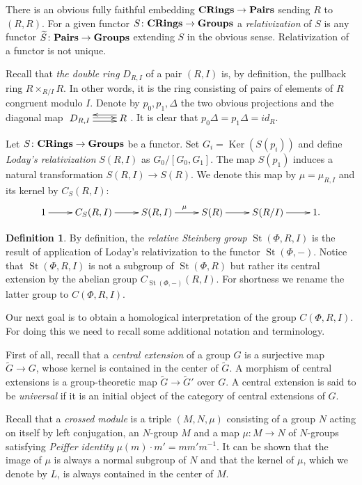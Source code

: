 \documentclass[oneside, 8pt]{amsart}
\theoremstyle{remark}
\theoremstyle{definition}
\numberwithin{lemma}{section}
\numberwithin{prop}{section}
\numberwithin{corollary}{section}
\numberwithin{externaltheorem}{section}
\newtheorem{df}[lemma]{Definition} \Crefname{df}{Definition}{Definitions}
\DeclareMathOperator{\Ker}{Ker}
\DeclareMathOperator{\St}{St}
\newcommand{\catname}[1]{{\normalfont\textbf{#1}}} %
\numberwithin{equation}{section}
\begin{document}
There is an obvious fully faithful embedding $\catname{CRings} \to \catname{Pairs}$ sending $R$ to $(R, R)$. For a given functor $S \colon \catname{CRings} \to \catname{Groups}$ a {\it relativization} of $S$ is any functor $\widetilde{S} \colon \catname{Pairs} \to \catname{Groups}$ extending $S$ in the obvious sense. Relativization of a functor is not unique.

Recall that {\it the double ring} $D_{R, I}$ of a pair $(R, I)$ is, by definition, the pullback ring $R \times_{R/I} R$. In other words, it is the ring consisting of pairs of elements of $R$ congruent modulo $I$. Denote by $p_0, p_1, \Delta$ the two obvious projections and the diagonal map $\xymatrix{D_{R,I} \ar@<1pt>[r] \ar@<-2.5pt>[r] & \ar@<-4pt>[l] R}$. It is clear that $p_0 \Delta = p_1 \Delta = id_{R}$.

Let $S \colon \catname{CRings} \to \catname{Groups}$ be a functor. Set $G_i = \Ker(S(p_i))$ and define {\it Loday's relativization} $S(R, I)$ as $ G_0 / [G_0, G_1]$. The map $S(p_1)$ induces a natural transformation $S(R, I) \to S(R)$. We denote this map by $\mu = \mu_{R,I}$ and its kernel by $C_S(R, I)$: \begin{equation} \label{LodayRelativization} \xymatrix{ 1 \ar[r] & C_S(R, I) \ar[r] & S(R, I) \ar^{\mu}[r] & S(R) \ar[r] & S(R/I) \ar[r] & 1.} \end{equation}

\begin{df} By definition, the {\it relative Steinberg group} $\St(\Phi, R, I)$ is the result of application of Loday's relativization to the functor $\St(\Phi, -)$. Notice that $\St(\Phi, R, I)$ is not a subgroup of $\St(\Phi, R)$ but rather its central extension by the abelian group $C_{\St(\Phi, -)}(R, I)$. For shortness we rename the latter group to $C(\Phi, R, I)$. \end{df}

Our next goal is to obtain a homological interpretation of the group $C(\Phi, R, I)$.
For doing this we need to recall some additional notation and terminology.

First of all, recall that a {\it central extension} of a group $G$ is a surjective map $\widetilde{G} \to G$, whose kernel is contained in the center of $\widetilde{G}$. 
A morphism of central extensions is a group-theoretic map $\widetilde{G} \to \widetilde{G}'$ over $G$.
A central extension is said to be {\it universal} if it is an initial object of the category of central extensions of $G$.

Recall that a {\it crossed module} is a triple $(M, N, \mu)$ consisting of a group $N$ acting on itself by left conjugation, an $N$-group $M$ and a map
 $\mu \colon M\to N$ of $N$-groups satisfying {\it Peiffer identity} $\mu(m) \cdot m' = m m' m^{-1}$. It can be shown that the image of $\mu$ is always
  a normal subgroup of $N$ and that the kernel of $\mu$, which we denote by $L$, is always contained in the center of $M$.
 
\end{document}
